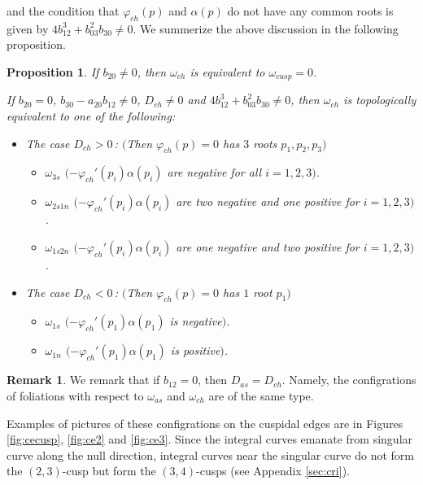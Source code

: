 \documentclass[a4paper, 12pt]{article}
\newtheorem{proposition}[theorem]{Proposition}
\theoremstyle{definition}
\newtheorem{remark}[theorem]{Remark}
\numberwithin{equation}{section}
\begin{document}
and the condition that ${\varphi}_{ch}(p)$ and $\alpha(p)$ do
not have any common roots is given by
$4b_{12}^3 + b_{03}^2 b_{30}\ne0$.
We summerize the above discussion in the following
proposition.
\begin{proposition}\label{prop:char}
If\/ $b_{20}\ne0$, 
then\/ $\omega_{ch}$ is equivalent
to\/ $\omega_{cusp}=0$.

If\/ $b_{20}=0$, $b_{30}-a_{20} b_{12}\ne0$,
$D_{ch}\ne0$ and\/ $4b_{12}^3 + b_{03}^2 b_{30}\ne0$,
then\/ $\omega_{ch}$ is topologically equivalent
to one of the following\/{\rm :}
\begin{itemize}
\item The case\/ $D_{ch}>0$\,{\rm :} 
$($Then\/ ${\varphi}_{ch}(p)=0$ has\/ $3$ roots\/ $p_1,p_2,p_3)$
\begin{itemize}
\item $\omega_{3s}$ $($$-{\varphi}_{ch}'(p_i)\alpha(p_i)$ are
negative for all\/ $i=1,2,3)$.
\item $\omega_{2s1n}$ $($$-{\varphi}_{ch}'(p_i)\alpha(p_i)$ are
two negative and one positive for\/ $i=1,2,3)$.
\item $\omega_{1s2n}$ $($$-{\varphi}_{ch}'(p_i)\alpha(p_i)$ are
one negative and two positive for\/ $i=1,2,3)$.
\end{itemize}
\item The case $D_{ch}<0$\,{\rm :} 
$($Then\/ ${\varphi}_{ch}(p)=0$ has\/ $1$ root\/ $p_1)$
\begin{itemize}
\item $\omega_{1s}$ $($$-{\varphi}_{ch}'(p_1)\alpha(p_1)$ is
negative\/$)$.
\item $\omega_{1n}$ $($$-{\varphi}_{ch}'(p_1)\alpha(p_1)$ is
positive\/$)$.
\end{itemize}
\end{itemize}
\end{proposition}
\begin{remark}
We remark that if $b_{12}=0$, then $D_{as}=D_{ch}$.
Namely, the configrations of foliations with respect to
$\omega_{as}$ and $\omega_{ch}$ are of the same type.
\end{remark}

Examples of pictures of these configrations on 
the cuspidal edges
are in Figures \ref{fig:cecusp},
\ref{fig:ce2} and \ref{fig:ce3}.
Since the integral curves emanate from singular curve
along the null direction,
integral curves near the singular curve do not form the
$(2,3)$-cusp but form the $(3,4)$-cusps
(see Appendix \ref{sec:cri}).
\end{document}
